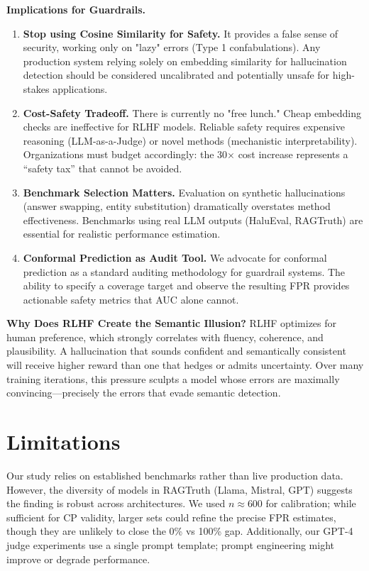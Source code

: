 \documentclass[11pt]{article}
\begin{document}
\textbf{Implications for Guardrails.}
\begin{enumerate}
    \item \textbf{Stop using Cosine Similarity for Safety.} It provides a false sense of security, working only on "lazy" errors (Type 1 confabulations). Any production system relying solely on embedding similarity for hallucination detection should be considered uncalibrated and potentially unsafe for high-stakes applications.
    \item \textbf{Cost-Safety Tradeoff.} There is currently no "free lunch." Cheap embedding checks are ineffective for RLHF models. Reliable safety requires expensive reasoning (LLM-as-a-Judge) or novel methods (mechanistic interpretability). Organizations must budget accordingly: the 30$\times$ cost increase represents a ``safety tax'' that cannot be avoided.
    \item \textbf{Benchmark Selection Matters.} Evaluation on synthetic hallucinations (answer swapping, entity substitution) dramatically overstates method effectiveness. Benchmarks using real LLM outputs (HaluEval, RAGTruth) are essential for realistic performance estimation.
    \item \textbf{Conformal Prediction as Audit Tool.} We advocate for conformal prediction as a standard auditing methodology for guardrail systems. The ability to specify a coverage target and observe the resulting FPR provides actionable safety metrics that AUC alone cannot.
\end{enumerate}

\textbf{Why Does RLHF Create the Semantic Illusion?} RLHF optimizes for human preference, which strongly correlates with fluency, coherence, and plausibility. A hallucination that sounds confident and semantically consistent will receive higher reward than one that hedges or admits uncertainty. Over many training iterations, this pressure sculpts a model whose errors are maximally convincing---precisely the errors that evade semantic detection.

\section{Limitations}

Our study relies on established benchmarks rather than live production data. However, the diversity of models in RAGTruth (Llama, Mistral, GPT) suggests the finding is robust across architectures. We used $n \approx 600$ for calibration; while sufficient for CP validity, larger sets could refine the precise FPR estimates, though they are unlikely to close the 0\% vs 100\% gap. Additionally, our GPT-4 judge experiments use a single prompt template; prompt engineering might improve or degrade performance.
\end{document}
